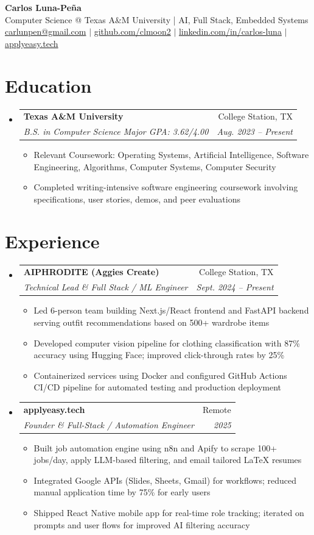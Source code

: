 \documentclass[letterpaper,11pt]{article}
\makeatletter
\newcommand{\resumeItem}[1]{
  \item\small{{#1 \vspace{-2pt}}}
}
\newcommand{\resumeSubheading}[4]{
  \vspace{-2pt}\item
    \begin{tabular*}{0.97\textwidth}[t]{l@{\extracolsep{\fill}}r}
      \textbf{#1} & #2 \\
      \textit{\small#3} & \textit{\small #4} \\
    \end{tabular*}\vspace{-7pt}
}
\newcommand{\resumeSubHeadingListStart}{\begin{itemize}[leftmargin=0.15in, label={}]}
\newcommand{\resumeSubHeadingListEnd}{\end{itemize}}
\newcommand{\resumeItemListStart}{\begin{itemize}}
\newcommand{\resumeItemListEnd}{\end{itemize}\vspace{-5pt}}
\makeatother
\begin{document}
\begin{center}
  \textbf{{\Huge Carlos Luna-Pe\~na}} \\
  Computer Science @ Texas A\&M University | AI, Full Stack, Embedded Systems \\
  \href{mailto:carlunpen@gmail.com}{carlunpen@gmail.com} $|$
  \href{https://github.com/clmoon2}{github.com/clmoon2} $|$
  \href{https://linkedin.com/in/carlos-luna}{linkedin.com/in/carlos-luna} $|$
  \href{https://applyeasy.tech}{applyeasy.tech}
\end{center}

\section{Education}
\resumeSubHeadingListStart
  \resumeSubheading
    {Texas A\&M University}{College Station, TX}
    {B.S. in Computer Science \textbullet{} Major GPA: 3.62/4.00}{Aug. 2023 -- Present}
    \resumeItemListStart
      \resumeItem{Relevant Coursework: Operating Systems, Artificial Intelligence, Software Engineering, Algorithms, Computer Systems, Computer Security}
      \resumeItem{Completed writing-intensive software engineering coursework involving specifications, user stories, demos, and peer evaluations}
    \resumeItemListEnd
\resumeSubHeadingListEnd

\section{Experience}
\resumeSubHeadingListStart
  \resumeSubheading
    {AIPHRODITE (Aggies Create)}{College Station, TX}
    {Technical Lead \& Full Stack / ML Engineer}{Sept. 2024 -- Present}
    \resumeItemListStart
      \resumeItem{Led 6-person team building Next.js/React frontend and FastAPI backend serving outfit recommendations based on 500+ wardrobe items}
      \resumeItem{Developed computer vision pipeline for clothing classification with 87\% accuracy using Hugging Face; improved click-through rates by 25\%}
      \resumeItem{Containerized services using Docker and configured GitHub Actions CI/CD pipeline for automated testing and production deployment}
    \resumeItemListEnd

  \resumeSubheading
    {applyeasy.tech}{Remote}
    {Founder \& Full-Stack / Automation Engineer}{2025}
    \resumeItemListStart
      \resumeItem{Built job automation engine using n8n and Apify to scrape 100+ jobs/day, apply LLM-based filtering, and email tailored LaTeX resumes}
      \resumeItem{Integrated Google APIs (Slides, Sheets, Gmail) for workflows; reduced manual application time by 75\% for early users}
      \resumeItem{Shipped React Native mobile app for real-time role tracking; iterated on prompts and user flows for improved AI filtering accuracy}
    \resumeItemListEnd
\resumeSubHeadingListEnd
\end{document}

